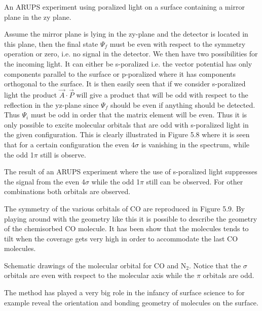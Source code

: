 \vspace*{11cm}

           An ARUPS experiment using poralized light on a surface containing a mirror plane in the zy plane.

\vspace{1cm}

Assume the mirror plane is lying in the zy-plane and the detector is located in this plane, then the final state  $\Psi_{f}$ must be even with respect to the symmetry operation or zero, i.e. no signal in the detector. We then have two possibilities for the incoming light. It can either be s-poralized i.e. the vector potential has only components parallel to the surface or p-poralized where it has components orthogonal to the surface. It is then easily seen that if we consider s-poralized light the product $\overrightarrow{A} \cdot \overrightarrow{P}$ will give a product that will be odd with respect to the reflection in the yz-plane since $\Psi_f$ should be even if anything should be detected. Thus $\Psi_i$ must be odd in order that the matrix element will be even. Thus it is only possible to excite molecular orbitals that are odd with s-poralized light in the given configuration. This is clearly illustrated in Figure 5.8 where it is seen that for a certain configuration the even 4$\sigma$ is vanishing in the spectrum, while the odd 1$\pi$ still is observe. 

\vspace*{11cm}

            The result of an ARUPS experiment where the use of s-poralized light suppresses the signal from the even 4$\sigma$ while the odd 1$\pi$ still can be observed. For other combinations both orbitals are observed.

\vspace{1cm}

The symmetry of the various orbitals of CO are reproduced in Figure 5.9. By playing around with the geometry like this it is possible to describe the geometry of the chemisorbed CO molecule. It has been show that the molecules tends to tilt when the coverage gets very high in order to accommodate the last CO molecules.

\vspace*{11cm}

            Schematic drawings of the molecular orbital for CO and N$_{2}$. Notice that the $\sigma$ orbitals are even with respect to the molecular axis while the $\pi$ orbitals are odd.

\vspace{1cm}

The method has played a very big role in the infancy of surface science to for example reveal the orientation and bonding geometry of molecules on the surface.